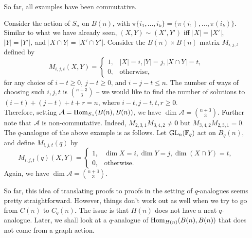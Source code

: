 	 So far, all examples have been commutative.

	 \begin{fex}
	 	Consider the action of $S_n$ on $B(n)$, with $\pi \{i_1,\ldots,i_k\} = \{\pi(i_1),\ldots,\pi(i_k)\}$. Similar to what we have already seen, $(X,Y) \sim (X',Y')$ iff $|X| = |X'|$, $|Y| = |Y'|$, and $|X \cap Y| = |X' \cap Y'|$. Consider the $B(n) \times B(n)$ matrix $M_{i,j,t}$ defined by
	 	\[
	 	M_{i,j,t}(X,Y) =
	 	\begin{cases}
	 		1, & |X|=i, |Y|=j, |X \cap Y| = t, \\ 0, & \text{otherwise,}
	 	\end{cases}
	 	\]
	 	for any choice of $i-t\ge 0$, $j-t\ge 0$, and $i+j-t \le n$. The number of ways of choosing such $i,j,t$ is $\binom{n+3}{3}$ -- we would like to find the number of solutions to $(i-t) + (j-t) + t + r = n$, where $i-t,j-t,t,r \ge 0$.\\
	 	Therefore, setting $\mathcal{A} = \operatorname{Hom}_{S_n}(B(n),B(n))$, we have $\dim \mathcal{A} = \binom{n+3}{3}$. Further note that $\mathcal{A}$ is non-commutative. Indeed, $M_{2,3,1} M_{3,4,2} \ne 0$ but $M_{3,4,2} M_{2,3,1} = 0$.\\

	 	The $q$-analogue of the above example is as follows. Let $\operatorname{GL}_n(\mathbb{F}_q)$ act on $B_q(n)$, and define $M_{i,j,t}(q)$ by
	 	\[ M_{i,j,t}(q)(X,Y) = \begin{cases} 1, & \dim X = i, \dim Y = j, \dim (X \cap Y) = t, \\ 0, & \text{otherwise.} \end{cases} \]
	 	Again, we have $\dim \mathcal{A} = \binom{n+3}{3}$.
	 \end{fex}

	So far, this idea of translating proofs to proofs in the setting of $q$-analogues seems pretty straightforward. However, things don't work out as well when we try to go from $C(n)$ to $C_q(n)$. The issue is that $H(n)$ does not have a neat $q$-analogue. Later, we shall look at a $q$-analogue of $\operatorname{Hom}_{H(n)}(B(n),B(n))$ that does not come from a graph action.

